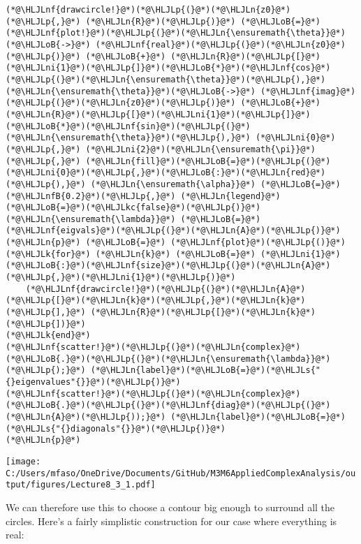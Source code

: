 \documentclass[12pt,landscape]{article}
\newcommand{\HLJLk}[1]{\textcolor[RGB]{148,91,176}{\textbf{#1}}}
\newcommand{\HLJLkc}[1]{\textcolor[RGB]{59,151,46}{\textit{#1}}}
\newcommand{\HLJLn}[1]{#1}
\newcommand{\HLJLnf}[1]{\textcolor[RGB]{66,102,213}{#1}}
\newcommand{\HLJLs}[1]{\textcolor[RGB]{201,61,57}{#1}}
\newcommand{\HLJLnfB}[1]{\textcolor[RGB]{59,151,46}{#1}}
\newcommand{\HLJLni}[1]{\textcolor[RGB]{59,151,46}{#1}}
\newcommand{\HLJLoB}[1]{\textcolor[RGB]{102,102,102}{\textbf{#1}}}
\newcommand{\HLJLp}[1]{#1}
\def\cent#1{\begin{center}#1\end{center} }
\begin{document}
{\begin{lstlisting}
(*@\HLJLnf{drawcircle!}@*)(*@\HLJLp{(}@*)(*@\HLJLn{z0}@*)(*@\HLJLp{,}@*) (*@\HLJLn{R}@*)(*@\HLJLp{)}@*) (*@\HLJLoB{=}@*) (*@\HLJLnf{plot!}@*)(*@\HLJLp{(}@*)(*@\HLJLn{\ensuremath{\theta}}@*)(*@\HLJLoB{->}@*) (*@\HLJLnf{real}@*)(*@\HLJLp{(}@*)(*@\HLJLn{z0}@*)(*@\HLJLp{)}@*) (*@\HLJLoB{+}@*) (*@\HLJLn{R}@*)(*@\HLJLp{[}@*)(*@\HLJLni{1}@*)(*@\HLJLp{]}@*)(*@\HLJLoB{*}@*)(*@\HLJLnf{cos}@*)(*@\HLJLp{(}@*)(*@\HLJLn{\ensuremath{\theta}}@*)(*@\HLJLp{),}@*) (*@\HLJLn{\ensuremath{\theta}}@*)(*@\HLJLoB{->}@*) (*@\HLJLnf{imag}@*)(*@\HLJLp{(}@*)(*@\HLJLn{z0}@*)(*@\HLJLp{)}@*) (*@\HLJLoB{+}@*) (*@\HLJLn{R}@*)(*@\HLJLp{[}@*)(*@\HLJLni{1}@*)(*@\HLJLp{]}@*)(*@\HLJLoB{*}@*)(*@\HLJLnf{sin}@*)(*@\HLJLp{(}@*)(*@\HLJLn{\ensuremath{\theta}}@*)(*@\HLJLp{),}@*) (*@\HLJLni{0}@*)(*@\HLJLp{,}@*) (*@\HLJLni{2}@*)(*@\HLJLn{\ensuremath{\pi}}@*)(*@\HLJLp{,}@*) (*@\HLJLn{fill}@*)(*@\HLJLoB{=}@*)(*@\HLJLp{(}@*)(*@\HLJLni{0}@*)(*@\HLJLp{,}@*)(*@\HLJLoB{:}@*)(*@\HLJLn{red}@*)(*@\HLJLp{),}@*) (*@\HLJLn{\ensuremath{\alpha}}@*) (*@\HLJLoB{=}@*) (*@\HLJLnfB{0.2}@*)(*@\HLJLp{,}@*) (*@\HLJLn{legend}@*)(*@\HLJLoB{=}@*)(*@\HLJLkc{false}@*)(*@\HLJLp{)}@*)
(*@\HLJLn{\ensuremath{\lambda}}@*) (*@\HLJLoB{=}@*) (*@\HLJLnf{eigvals}@*)(*@\HLJLp{(}@*)(*@\HLJLn{A}@*)(*@\HLJLp{)}@*)
(*@\HLJLn{p}@*) (*@\HLJLoB{=}@*) (*@\HLJLnf{plot}@*)(*@\HLJLp{()}@*)
(*@\HLJLk{for}@*) (*@\HLJLn{k}@*) (*@\HLJLoB{=}@*) (*@\HLJLni{1}@*)(*@\HLJLoB{:}@*)(*@\HLJLnf{size}@*)(*@\HLJLp{(}@*)(*@\HLJLn{A}@*)(*@\HLJLp{,}@*)(*@\HLJLni{1}@*)(*@\HLJLp{)}@*)
    (*@\HLJLnf{drawcircle!}@*)(*@\HLJLp{(}@*)(*@\HLJLn{A}@*)(*@\HLJLp{[}@*)(*@\HLJLn{k}@*)(*@\HLJLp{,}@*)(*@\HLJLn{k}@*)(*@\HLJLp{],}@*) (*@\HLJLn{R}@*)(*@\HLJLp{[}@*)(*@\HLJLn{k}@*)(*@\HLJLp{])}@*)
(*@\HLJLk{end}@*)
(*@\HLJLnf{scatter!}@*)(*@\HLJLp{(}@*)(*@\HLJLn{complex}@*)(*@\HLJLoB{.}@*)(*@\HLJLp{(}@*)(*@\HLJLn{\ensuremath{\lambda}}@*)(*@\HLJLp{);}@*) (*@\HLJLn{label}@*)(*@\HLJLoB{=}@*)(*@\HLJLs{"{}eigenvalues"{}}@*)(*@\HLJLp{)}@*)
(*@\HLJLnf{scatter!}@*)(*@\HLJLp{(}@*)(*@\HLJLn{complex}@*)(*@\HLJLoB{.}@*)(*@\HLJLp{(}@*)(*@\HLJLnf{diag}@*)(*@\HLJLp{(}@*)(*@\HLJLn{A}@*)(*@\HLJLp{));}@*) (*@\HLJLn{label}@*)(*@\HLJLoB{=}@*)(*@\HLJLs{"{}diagonals"{}}@*)(*@\HLJLp{)}@*)
(*@\HLJLn{p}@*)
\end{lstlisting}

\cent{\texttt{[image: C:/Users/mfaso/OneDrive/Documents/GitHub/M3M6AppliedComplexAnalysis/output/figures/Lecture8\_3\_1.pdf]}}

We can therefore use this to choose a contour big enough to surround all the circles. Here's a fairly simplistic construction for our case where everything is real:


}
\end{document}
